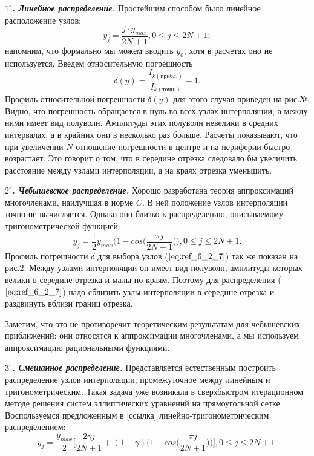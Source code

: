 \textbf{\textit{$1^{\circ}$. Линейное распределение.}} Простейшим способом было линейное
расположение узлов:
\begin{equation}
y_j = \frac{j \cdot y_{max}}{2N+1}, 0 \leqslant j \leqslant 2N +1;
\label{eq:ref_6_2_5}
\end{equation}
напомним, что формально мы можем вводить $y_0$, хотя в расчетах оно не используется. Введем относительную погрешность
\begin{equation}
\delta(y) = \frac{I_{k(прибл.)}}{I_{k(точн.)}} - 1.
\label{eq:ref_6_2_6}
\end{equation}
Профиль относительной погрешности $\delta(y)$ для этого случая приведен на рис.№. Видно, что погрешность обращается в нуль во всех узлах интерполяции, а между ними имеет вид полуволн. Амплитуды этих полуволн невелики в средних интервалах, а в крайних они в несколько раз
больше. Расчеты показывают, что при увеличении $N$ отношение погрешности в центре и на периферии быстро возрастает. Это говорит о том, что в середине отрезка следовало бы увеличить расстояние между узлами интерполяции, а на краях отрезка уменьшить.

\textbf{\textit{$2^{\circ}$. Чебышевское распределение.}} Хорошо разработана теория аппроксимаций многочленами, наилучшая в норме $C$. В ней положение узлов интерполяции точно не вычисляется. Однако оно близко к распределению, описываемому тригонометрической функцией:
\begin{equation}
y_j = \frac{1}{2} y_{max} \Bigg(1 - cos\Bigg( \frac{\pi j}{2N+1} \Bigg) \Bigg),0 \leqslant j \leqslant 2N + 1.
\label{eq:ref_6_2_7}
\end{equation}
Профиль погрешности $\delta$ для выбора узлов ($\ref{eq:ref_6_2_7}$) так же показан на рис.2. Между узлами интерполяции он имеет вид полуволн, амплитуды которых велики в середине отрезка и малы по краям. Поэтому для распределения ($\ref{eq:ref_6_2_7}$) надо сблизить узлы интерполяции в середине отрезка и раздвинуть вблизи границ отрезка.

Заметим, что это не противоречит теоретическим результатам для чебышевских приближений: они относятся к аппроксимации многочленами, а мы используем аппроксимацию рациональными функциями.

\textbf{\textit{$3^{\circ}$. Смешанное распределение.}} Представляется естественным построить распределение узлов интерполяции, промежуточное между линейным и тригонометрическим. Такая задача уже возникала в сверхбыстром итерационном методе решения систем эллиптических уравнений на прямоугольной сетке. Воспользуемся предложенным в [ссылка] линейно-тригонометрическим распределением:
\begin{equation}
y_j = \frac{y_{max}}{2} \Bigg[ \frac{2\gamma j}{2N+1} + (1-\gamma)\Bigg(1 - cos \Bigg(\frac{\pi j}{2N + 1}\Bigg) \Bigg)\Bigg], 0 \leqslant j \leqslant 2N+1.
\label{eq:ref_6_2_8}
\end{equation}

